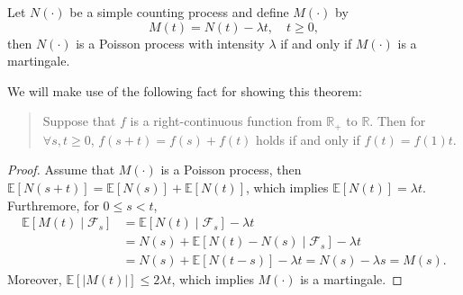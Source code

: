 \begin{theorem}
Let $N(\cdot)$ be a simple counting process and define $M(\cdot)$ by
\[
M(t)=N(t)-\lambda t,\quad t\ge0,
\]
then $N(\cdot)$ is a Poisson process with intensity $\lambda$ if and only if $M(\cdot)$ is a martingale.
\end{theorem}
We will make use of the following fact for showing this theorem:
\begin{quotation}
Suppose that $f$ is a right-continuous function from $\mathbb{R}_+$ to $\mathbb{R}$.
Then for $\forall s,t\ge0$, $f(s+t)=f(s)+f(t)$ holds if and only if $f(t)=f(1)t$.
\end{quotation}
\begin{proof}
Assume that $M(\cdot)$ is a Poisson process, then $\mathbb{E}[N(s+t)]=\mathbb{E}[N(s)]+\mathbb{E}[N(t)]$, which implies $\mathbb{E}[N(t)]=\lambda t$.
Furthremore, for $0\le s<t$,
\begin{align*}
\mathbb{E}[M(t)\mid\mathcal{F}_s]&=\mathbb{E}[N(t)\mid\mathcal{F}_s]-\lambda t\\
&=N(s)+\mathbb{E}[N(t)-N(s)\mid\mathcal{F}_s]-\lambda t\\
&=N(s)+\mathbb{E}[N(t-s)]-\lambda t=N(s)-\lambda s=M(s).
\end{align*}
Moreover, $\mathbb{E}[|M(t)|]\le 2\lambda t$, which implies $M(\cdot)$ is a martingale.


\end{proof}

